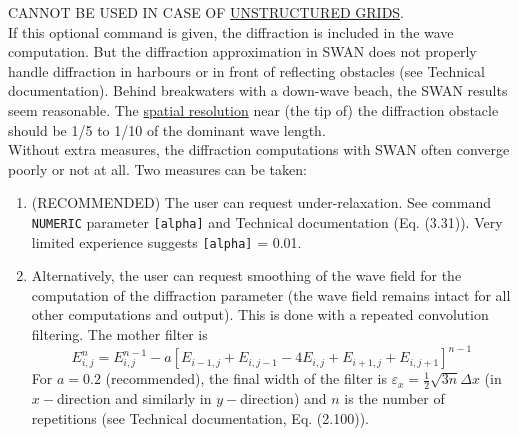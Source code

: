 \documentclass[12pt]{book}
\begin{document}
\noindent
CANNOT BE USED IN CASE OF \underline{UNSTRUCTURED GRIDS}.
\\[2ex]
\noindent
If this optional command is given, the diffraction is included in the wave computation.
But the diffraction approximation in SWAN does not properly handle diffraction in harbours
or in front of reflecting obstacles (see Technical documentation). Behind breakwaters with a
down-wave beach, the SWAN results seem reasonable. The \underline{spatial resolution} near (the tip of)
the diffraction obstacle should be 1/5 to 1/10 of the dominant wave length.
\\[2ex]
\noindent
Without extra measures, the diffraction computations with SWAN often converge poorly or not at all. Two
measures can be taken:
\begin{enumerate}
  \item (RECOMMENDED) The user can request under-relaxation. See command {\tt NUMERIC} parameter {\tt [alpha]}
        and Technical documentation (Eq. (3.31)). Very limited experience suggests {\tt [alpha]} = 0.01.
  \item Alternatively, the user can request smoothing of the wave field for the computation of the diffraction
        parameter (the wave field remains intact for all other computations and output). This is done with a
        repeated convolution filtering. The mother filter is
        \begin{displaymath}
           E^n_{i,j} = E^{n-1}_{i,j} - a \left[ E_{i-1,j} + E_{i,j-1} -4E_{i,j} + E_{i+1,j} + E_{i,j+1} \right]^{n-1}
        \end{displaymath}
        For $a = 0.2$ (recommended), the final width of the filter is $\varepsilon_x = \frac{1}{2} \sqrt{3n} \Delta x$
        (in $x-$direction and similarly in $y-$direction) and $n$ is the number of repetitions (see Technical
        documentation, Eq. (2.100)).
\end{enumerate}
\end{document}
